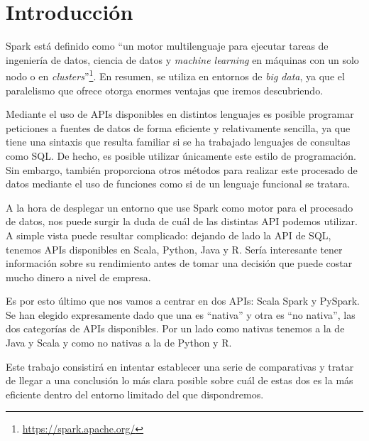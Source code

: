 \documentclass[12pt,twoside,titlepage]{report}
\newcommand{\quotes}[1]{``#1''}
\begin{document}
\chapter{Introducción}
\newpage


\pagestyle{fancy}


\setlength{\parskip}{0.75em}
\renewcommand{\baselinestretch}{1.25}
\setcounter{page}{1}


Spark está definido como \quotes{un motor multilenguaje para ejecutar tareas de ingeniería de datos, ciencia de datos y \textit{machine learning} en máquinas con un solo nodo o en \textit{clusters}}\footnote{\url{https://spark.apache.org/}}. En resumen, se utiliza en entornos de \textit{big data}, ya que el paralelismo que ofrece otorga enormes ventajas que iremos descubriendo.

Mediante el uso de APIs disponibles en distintos lenguajes es posible programar peticiones a fuentes de datos de forma eficiente y relativamente sencilla, ya que tiene una sintaxis que resulta familiar si se ha trabajado lenguajes de consultas como SQL. De hecho, es posible utilizar únicamente este estilo de programación. Sin embargo, también proporciona otros métodos para realizar este procesado de datos mediante el uso de funciones como si de un lenguaje funcional se tratara.

A la hora de desplegar un entorno que use Spark como motor para el procesado de datos, nos puede surgir la duda de cuál de las distintas API podemos utilizar. A simple vista puede resultar complicado: dejando de lado la API de SQL, tenemos APIs disponibles en Scala, Python, Java y R. Sería interesante tener información sobre su rendimiento antes de tomar una decisión que puede costar mucho dinero a nivel de empresa.

Es por esto último que nos vamos a centrar en dos APIs: Scala Spark y PySpark. Se han elegido expresamente dado que una es \quotes{nativa} y otra es \quotes{no nativa}, las dos categorías de APIs disponibles. Por un lado como nativas tenemos a la de Java y Scala y como no nativas a la de Python y R.

Este trabajo consistirá en intentar establecer una serie de comparativas y tratar de llegar a una conclusión lo más clara posible sobre cuál de estas dos es la más eficiente dentro del entorno limitado del que dispondremos.
\end{document}
